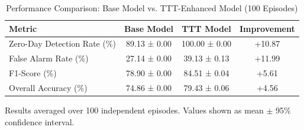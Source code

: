 \begin{table}[htbp]
\centering
\caption{Performance Comparison: Base Model vs. TTT-Enhanced Model (100 Episodes)}
\label{tab:performance}
\begin{tabular}{lccc}
\hline
Metric & Base Model & TTT Model & Improvement \\
\hline
Zero-Day Detection Rate (\%) & 89.13 ± 0.00 & 100.00 ± 0.00 & +10.87 \\
False Alarm Rate (\%) & 27.14 ± 0.00 & 39.13 ± 0.13 & +11.99 \\
F1-Score (\%) & 78.90 ± 0.00 & 84.51 ± 0.04 & +5.61 \\
Overall Accuracy (\%) & 74.86 ± 0.00 & 79.43 ± 0.06 & +4.56 \\
\hline
\end{tabular}
\begin{tablenotes}
\small
\item Results averaged over 100 independent episodes. Values shown as mean $\pm$ 95\% confidence interval.
\end{tablenotes}
\end{table}
